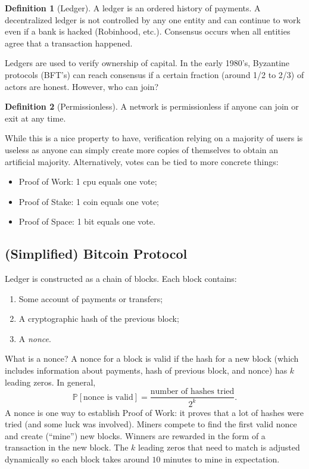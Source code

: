 \documentclass[dvipsnames]{article}
\renewcommand{\P}[1]{\mathbb{P}\left[#1\right]}
\theoremstyle{definition}
\newtheorem{definition}{Definition}[section]
\theoremstyle{remark}
\begin{document}
\begin{definition}[Ledger]
	A ledger is an ordered history of payments. A decentralized ledger is not controlled by any one entity and can continue to work even if a bank is hacked (Robinhood, etc.). Consensus occurs when all entities agree that a transaction happened.
\end{definition}

Ledgers are used to verify ownership of capital. In the early 1980's, Byzantine protocols (BFT's) can reach consensus if a certain fraction (around 1/2 to 2/3) of actors are honest. However, who can join?

\begin{definition}[Permissionless]
	A network is permissionless if anyone can join or exit at any time.
\end{definition}

While this is a nice property to have, verification relying on a majority of users is useless as anyone can simply create more copies of themselves to obtain an artificial majority. Alternatively, votes can be tied to more concrete things:
\begin{itemize}
	\item Proof of Work: 1 cpu equals one vote;
	\item Proof of Stake: 1 coin equals one vote;
	\item Proof of Space: 1 bit equals one vote.
\end{itemize} 

\subsection{(Simplified) Bitcoin Protocol}

Ledger is constructed as a chain of blocks. Each block contains:
\begin{enumerate}
	\item Some account of payments or transfers;
	\item A cryptographic hash of the previous block;
	\item A \textit{nonce}.
\end{enumerate}

What is a nonce? A nonce for a block is valid if the hash for a new block (which includes information about payments, hash of previous block, and nonce) has $k$ leading zeros. In general,
$$\P{\text{nonce is valid}} = \frac{\text{number of hashes tried}}{2^k}.$$
A nonce is one way to establish Proof of Work: it proves that a lot of hashes were tried (and some luck was involved). Miners compete to find the first valid nonce and create (``mine'') new blocks. Winners are rewarded in the form of a transaction in the new block. The $k$ leading zeros that need to match is adjusted dynamically so each block takes around $10$ minutes to mine in expectation.
\end{document}
